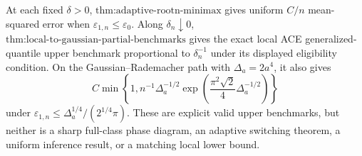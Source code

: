 At each fixed \(\delta>0\), \(\text{thm:adaptive-rootn-minimax}\) gives uniform \(C/n\) mean-squared error when \(\varepsilon_{1,n}\le\varepsilon_0\).  Along \(\delta_n\downarrow0\), \(\text{thm:local-to-gaussian-partial-benchmarks}\) gives the exact local ACE generalized-quantile upper benchmark proportional to \(\delta_n^{-1}\) under its displayed eligibility condition.  On the Gaussian--Rademacher path with \(\Delta_a=2a^4\), it also gives
\[
 C\min\!\left\{1,n^{-1}\Delta_a^{-1/2}
 \exp\!\left(\frac{\pi^2\sqrt2}{4}\Delta_a^{-1/2}\right)\right\}
\]
under \(\varepsilon_{1,n}\le\Delta_a^{1/4}/(2^{1/4}\pi)\).  These are explicit valid upper benchmarks, but neither is a sharp full-class phase diagram, an adaptive switching theorem, a uniform inference result, or a matching local lower bound.